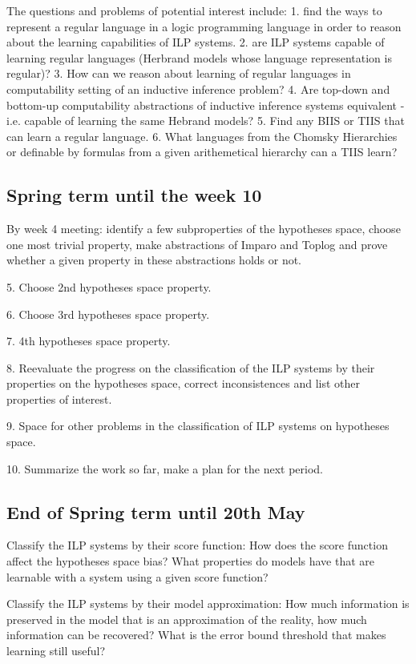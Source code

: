 The questions and problems of potential interest include:
1. find the ways to represent a regular language in a logic programming language in order to reason about the learning capabilities of ILP systems.
2. are ILP systems capable of learning regular languages (Herbrand models whose language representation is regular)?
3. How can we reason about learning of regular languages in computability setting of an inductive inference problem?
4. Are top-down and bottom-up computability abstractions of inductive inference systems equivalent - i.e. capable of learning the same Hebrand models?
5. Find any BIIS or TIIS that can learn a regular language.
6. What languages from the Chomsky Hierarchies or definable by formulas from a given arithemetical hierarchy can a TIIS learn?

\subsection{Spring term until the  week 10}
By week 4 meeting: identify a few subproperties of the hypotheses space,
choose one most trivial property, make abstractions of Imparo and Toplog and prove whether a given property in these abstractions holds or not.

5. Choose 2nd hypotheses space property.

6. Choose 3rd hypotheses space property.

7. 4th hypotheses space property.

8. Reevaluate the progress on the classification of the ILP systems by their properties on the hypotheses space, correct inconsistences and list other properties of interest.

9. Space for other problems in the classification of ILP systems on hypotheses space.

10. Summarize the work so far, make a plan for the next period.

\subsection{End of Spring term until 20th May}
Classify the ILP systems by their score function:
How does the score function affect the hypotheses space bias?
What properties do models have that are learnable with a system using a given score function?

Classify the ILP systems by their model approximation:
How much information is preserved in the model that is an approximation of the reality, how much information can be recovered?
What is the error bound threshold that makes learning still useful?

